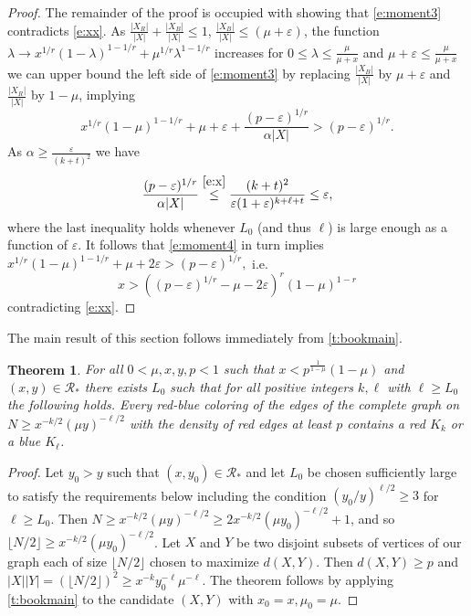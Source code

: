 \documentclass[reqno,final,12pt]{amsart}
\newtheorem{thm}{Theorem}
\newcommand{\eps}{\varepsilon}
\newcommand{\mc}[1]{\mathcal{#1}}
\begin{document}
\begin{proof}
The remainder of the proof is occupied with showing that \eqref{e:moment3} contradicts \eqref{e:xx}.
As $\frac{|X_R|}{|X|}+\frac{|X_B|}{|X|}\leq 1$, $\frac{|X_B|}{|X|} \leq (\mu+\eps)$, the function $\lambda \to x^{1/r}(1-\lambda)^{1-1/r} + \mu^{1/r}\lambda^{1-1/r} $ increases for $0 \leq \lambda \leq \frac{\mu}{\mu+x}$ and $ \mu+\eps \leq \frac{\mu}{\mu+x}$ we can upper bound the left side of \eqref{e:moment3} by replacing $\frac{|X_B|}{|X|} $ by $\mu+\eps$  and $\frac{|X_R|}{|X|} $ by $1-\mu$, implying
\begin{equation}\label{e:moment4}
x^{1/r}(1-\mu)^{1-1/r}+\mu+ \eps + \frac{(p-\eps)^{1/r}}{\alpha|X|} > (p-\eps)^{1/r}. 
\end{equation}
As $\alpha \geq \frac{\eps}{(k+t)^2}$ we have
$$ \frac{(p-\eps)^{1/r}}{\alpha|X|}  \stackrel{\eqref{e:x}}{\leq} \frac{(k+t)^2}{\eps(1+\eps)^{k+\ell+t}} \leq \eps,$$
where the last inequality holds whenever $L_0$ (and thus $\ell$) is large enough as a function of $\eps$.
It follows that \eqref{e:moment4} in turn implies
$x^{1/r}(1-\mu)^{1-1/r}+\mu+ 2\eps  > (p-\eps)^{1/r}, $ i.e.
$$ x > ((p-\eps)^{1/r} - \mu- 2\eps)^r(1-\mu)^{1-r} $$
contradicting \eqref{e:xx}.
\end{proof}

The main result of this section follows immediately from \cref{t:bookmain}.

\begin{thm}\label{t:bookCor}
For all $0< \mu,x,y,p <1$ such that $x < p^{\frac{1}{1-\mu}}(1-\mu)$ and $(x,y) \in \mc{R_*}$  there exists $L_0$ such that for all positive integers $k,\ell$ with $\ell \geq L_0$ the following holds. Every red-blue coloring of the edges of the complete graph on $N \geq x^{-k/2}(\mu y)^{-\ell/2}$ with the density of red edges  at least $p$ contains a red $K_k$ or a blue $K_{\ell}$. 
\end{thm}
\begin{proof}
Let $y_0 > y$ such that  $(x,y_0) \in \mc{R_*}$  and let $L_0$ be chosen sufficiently large to satisfy the requirements below including the condition $(y_0/y)^{\ell/2} \geq 3$ for $\ell\geq L_0$. Then $N  \geq x^{-k/2}(\mu y)^{-\ell/2} \geq 2x^{-k/2}(\mu y_0)^{-\ell/2} + 1$, and so $\lfloor N/2 \rfloor \geq x^{-k/2}(\mu y_0)^{-\ell/2}$. Let $X$ and $Y$ be two disjoint subsets of vertices of our graph each of size $\lfloor N/2 \rfloor$ chosen to maximize $d(X,Y)$. Then $d(X,Y) \geq p$ and $|X||Y| = (\lfloor N/2 \rfloor)^2 \geq x^{-k}y_0^{-\ell}\mu^{-\ell}$. The theorem follows by applying \cref{t:bookmain} to the candidate $(X,Y)$ with $x_0=x,\mu_0=\mu$.   
\end{proof}
\end{document}

